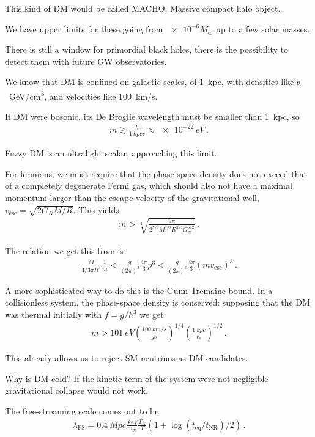 \documentclass[main.tex]{subfiles}
\begin{document}
This kind of DM would be called MACHO, Massive compact halo object. 

We have upper limits for these going from \(\num{e-6} M_{\odot}\) up to 
a few solar masses. 

There is still a window for primordial black holes, 
there is the possibility to detect them with future GW observatories. 

We know that DM is confined on galactic scales, of \SI{1}{kpc}, 
with densities like a \SI{}{GeV/cm^3}, and velocities like \SI{100}{km/s}. 

If DM were bosonic, its De Broglie wavelength must be smaller than \SI{1}{kpc}, so 
%
\begin{align}
m \gtrsim \frac{h}{\SI{1}{kpc} v} \approx \SI{e-22}{eV}
\,.
\end{align}

Fuzzy DM is an ultralight scalar, approaching this limit. 

For fermions, we must require that the phase space density does not 
exceed that of a completely degenerate Fermi gas, which should also 
not have a maximal momentum larger than the escape velocity of the 
gravitational well, \(v _{\text{esc}} = \sqrt{2 G_N M / R}\). 
This  yields 
%
\begin{align}
m > \sqrt[4]{\frac{9 \pi }{2^{5/2} M^{1/2} R^{3/2} G_N^{5/2}}}
\,.
\end{align}

The relation we get this from is 
%
\begin{align}
\frac{M}{4/3 \pi R^3} \frac{1}{m} < \frac{g}{(2 \pi )^3} \frac{4 \pi }{3} p^3 < \frac{g}{(2 \pi )^3} \frac{4 \pi }{3} (m v _{\text{esc}})^3
\,.
\end{align}

A more sophisticated way to do this is the Gunn-Tremaine bound. 
In a collisionless system, the phase-space density is conserved: 
supposing that the DM was thermal initially with \(f = g/h^3\) we get 
%
\begin{align}
m > \SI{101}{eV} \left(\frac{\SI{100}{km/s}}{g \sigma }\right)^{1/4} \left(\frac{\SI{1}{kpc}}{r_e}\right)^{1/2}
\,.
\end{align}

This already allows us to reject SM neutrinos as DM candidates. 

Why is DM cold? If the kinetic term of the system were not negligible gravitational collapse
would not work. 

The free-streaming scale comes out to be 
%
\begin{align}
\lambda _{\text{FS}} = \SI{0.4}{Mpc} \frac{\SI{}{keV}}{m_X} \frac{T_X}{T} \left(1 +  \log (t _{\text{eq}} / t _{\text{NR}}) / 2\right)
\,.
\end{align}
\end{document}
